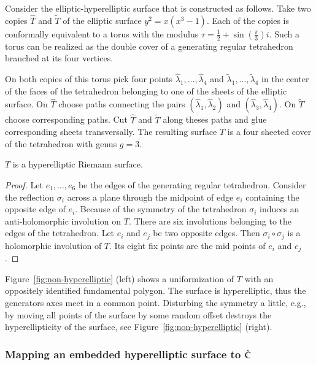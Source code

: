 \documentclass[Thesis.tex]{subfiles}
\begin{document}
Consider the elliptic-hyperelliptic surface that is constructed as follows. Take two copies $\hat T$ and $\tilde T$ of the elliptic surface $y^2=x(x^3 - 1)$. Each of the copies is conformally equivalent to a torus with the modulus $\tau=\frac{1}{2}+\sin(\frac{\pi}{3})i$. Such a torus can be realized as the double cover of a generating regular tetrahedron branched at its four vertices.

On both copies of this torus pick four points $\hat\lambda_1,\ldots,\hat\lambda_4$ and $\tilde\lambda_1,\ldots,\tilde\lambda_4$ in the center of the faces of the tetrahedron belonging to one of the sheets of the elliptic surface. On $\hat T$ choose paths connecting the pairs $(\hat\lambda_1,\hat\lambda_2)$ and $(\hat\lambda_3,\hat\lambda_4)$. On $\tilde T$ choose corresponding paths. Cut $\hat T$ and $\tilde T$ along theses paths and glue corresponding sheets transversally. The resulting surface $T$ is a four sheeted cover of the tetrahedron with genus $g = 3$.

\begin{theorem}
$T$ is a hyperelliptic Riemann surface.
\begin{proof}
Let $e_1,\ldots,e_6$ be the edges of the generating regular tetrahedron. Consider the reflection $\sigma_i$ across a plane through the midpoint of edge $e_i$ containing the opposite edge of $e_i$.  Because of the symmetry of the tetrahedron $\sigma_i$ induces an anti-holomorphic involution on $T$. There are six involutions belonging to the edges of the tetrahedron. Let $e_i$ and $e_j$ be two opposite edges. Then $\sigma_i \circ \sigma_j$ is a holomorphic involution of $T$. Its eight fix points are the mid points of $e_i$ and $e_j$.
\end{proof}
\end{theorem}

Figure~\ref{fig:non-hyperelliptic} (left) shows a uniformization of $T$ with an oppositely identified fundamental polygon. The surface is hyperelliptic, thus the generators axes meet in a common point. Disturbing the symmetry a little, e.g., by moving all points of the surface by some random offset destroys the hyperellipticity of the surface, see Figure~\ref{fig:non-hyperelliptic} (right).

\subsubsection{Mapping an embedded hyperelliptic surface to $\hat{\mathbb C}$}
\end{document}
